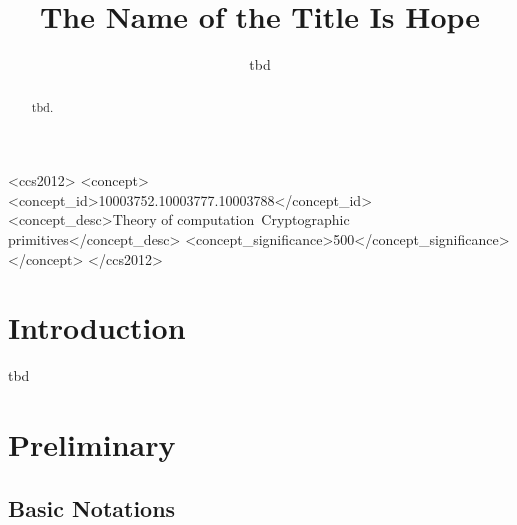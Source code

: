 \documentclass[sigconf]{acmart}
\begin{document}
\title{The Name of the Title Is Hope}

\author{tbd}

\renewcommand{\shortauthors}{tbd}

\begin{abstract}
  tbd. 
\end{abstract}

\begin{CCSXML}
  <ccs2012>
     <concept>
         <concept_id>10003752.10003777.10003788</concept_id>
         <concept_desc>Theory of computation~Cryptographic primitives</concept_desc>
         <concept_significance>500</concept_significance>
         </concept>
   </ccs2012>
\end{CCSXML}
  



\maketitle

\section{Introduction}
tbd

\section{Preliminary}
\subsection{Basic Notations}
\end{document}
